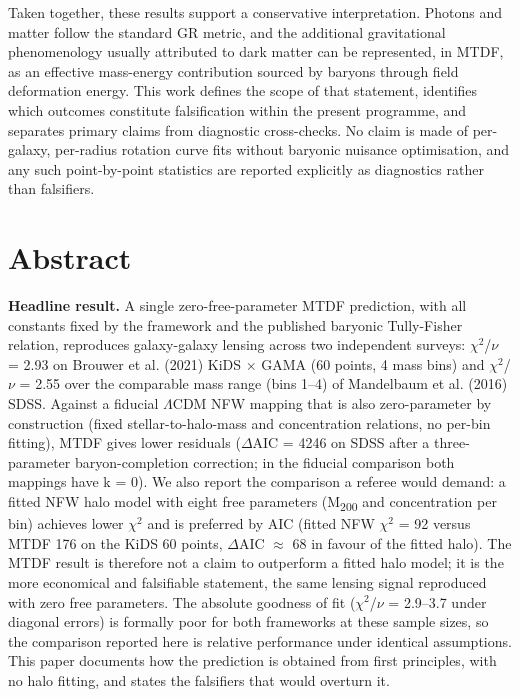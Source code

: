 \documentclass[11pt,a4paper]{article}
\begin{document}
Taken together, these results support a conservative interpretation. Photons and matter follow the standard GR metric, and the additional gravitational phenomenology usually attributed to dark matter can be represented, in MTDF, as an effective mass-energy contribution sourced by baryons through field deformation energy. This work defines the scope of that statement, identifies which outcomes constitute falsification within the present programme, and separates primary claims from diagnostic cross-checks. No claim is made of per-galaxy, per-radius rotation curve fits without baryonic nuisance optimisation, and any such point-by-point statistics are reported explicitly as diagnostics rather than falsifiers.

\section{Abstract}
\label{sec:abstract}
\textbf{Headline result.} A single zero-free-parameter MTDF prediction, with all constants fixed by the framework and the published baryonic Tully-Fisher relation, reproduces galaxy-galaxy lensing across two independent surveys: $\chi$$^{2}$/$\nu$ = 2.93 on Brouwer et al. (2021) KiDS $\times$ GAMA (60 points, 4 mass bins) and $\chi$$^{2}$/$\nu$ = 2.55 over the comparable mass range (bins 1--4) of Mandelbaum et al. (2016) SDSS. Against a fiducial $\Lambda$CDM NFW mapping that is also zero-parameter by construction (fixed stellar-to-halo-mass and concentration relations, no per-bin fitting), MTDF gives lower residuals ($\Delta$AIC = 4246 on SDSS after a three-parameter baryon-completion correction; in the fiducial comparison both mappings have k = 0). We also report the comparison a referee would demand: a fitted NFW halo model with eight free parameters (M\textsubscript{200} and concentration per bin) achieves lower $\chi$$^{2}$ and is preferred by AIC (fitted NFW $\chi$$^{2}$ = 92 versus MTDF 176 on the KiDS 60 points, $\Delta$AIC $\approx$ 68 in favour of the fitted halo). The MTDF result is therefore not a claim to outperform a fitted halo model; it is the more economical and falsifiable statement, the same lensing signal reproduced with zero free parameters. The absolute goodness of fit ($\chi$$^{2}$/$\nu$ = 2.9--3.7 under diagonal errors) is formally poor for both frameworks at these sample sizes, so the comparison reported here is relative performance under identical assumptions. This paper documents how the prediction is obtained from first principles, with no halo fitting, and states the falsifiers that would overturn it.
\end{document}
